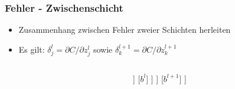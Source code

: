 \begin{frame}
\frametitle{Fehler - Zwischenschicht} 

\begin{itemize}
\item Zusammenhang zwischen Fehler zweier Schichten herleiten
\item Es gilt: $\delta^l_j = \partial C / \partial z^l_j$ sowie $\delta^{l+1}_k = \partial C / \partial z^{l+1}_k$
\end{itemize}

\begin{columns}

\begin{column}{.5\textwidth}
\vspace{-10mm}

\end{column}

\hspace{-15mm}
\vrule

\begin{column}{.5\textwidth}

\begin{center}
\begin{forest}
 [$z^{l+1}$
 	[$w^{l+1}$]
 	[$a^{l}$
 		[$z^{l}$
			[$w^l$]
			[$a^{l-1}$
				[\ldots]
			]
			[$b^{l}$]
 		]
 	]
 	[$b^{l+1}$]
 ]
\end{forest}
\end{center}

\end{column}
\end{columns}





\end{frame}



